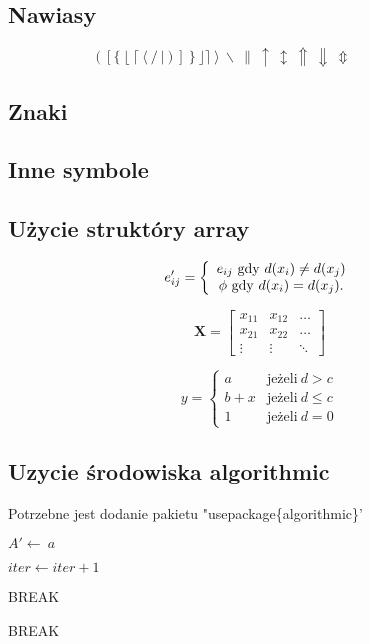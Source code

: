 \documentclass[a4paper,12pt]{article}
\begin{document}
\subsection{Nawiasy}
$$( \ [ \{ \ \lfloor \ \lceil \ \langle \  /\  |\  )\  ]\  \} \  \rfloor \rceil \ \rangle \ \backslash \ \| \ \uparrow \ \updownarrow \ \Uparrow \ \Downarrow \ \Updownarrow \ \qquad \ \quad \ \! \ \, \ \: \ \; \ $$ 

\subsection{Znaki}
\subsection{Inne symbole}
\subsection{Użycie struktóry array}
$$e'_{ij}=
\left\{
   \begin{array}{c}
	   e_{ij}\ {\rm gdy}\ d(x_i) \neq d(x_j) \\
		\phi\ {\rm gdy}\ d(x_i)=d(x_j). \\
 \end{array} \right.$$

\begin{equation}
\mathbf{X}=
\left [ \begin{array}{ccc}
x_{11} & x_{12} & \ldots \\
x_{21} & x_{22} & \ldots \\
\vdots & \vdots & \ddots 
\end{array} \right ]
\end{equation}

\begin{equation}
y = \left\{ \begin{array}{ll}
a & \textrm{jeżeli} \ d>c\\
b+x & \textrm{jeżeli} \ d\leq c\\
1 & \textrm{jeżeli} \ d=0
\end{array} \right.
\end{equation}

\subsection{Uzycie środowiska algorithmic}
Potrzebne jest dodanie pakietu "usepackage\{algorithmic\}'
\begin{algorithmic}
\item{$A' \leftarrow\ a$}
\item{$iter \leftarrow iter+1$}
\item{BREAK}
\ENDIF
\ENDIF
\ENDFOR
{}
\item{BREAK}
\ENDIF
\ENDFOR
{}
\end{algorithmic}
\end{document}
